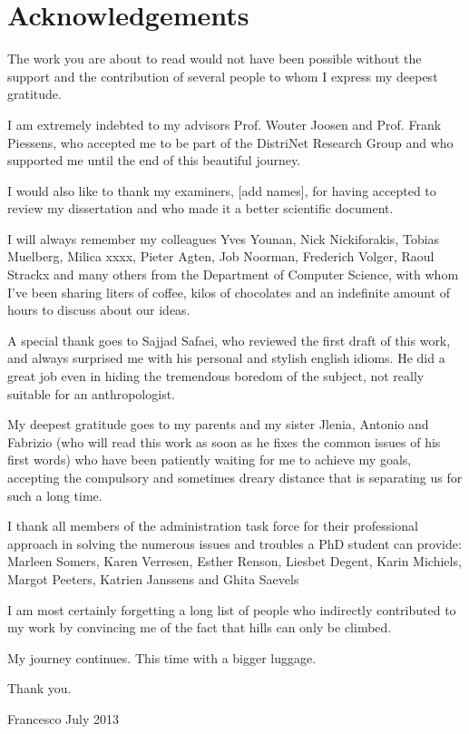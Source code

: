 \section*{Acknowledgements}

The work you are about to read would not have been possible without the support and the contribution of several people to whom I express my deepest gratitude.

I am extremely indebted to my advisors Prof. Wouter Joosen and Prof. Frank Piessens, who accepted me to be part of the DistriNet Research Group and who supported me until the end of this beautiful journey.

I would also like to thank my examiners, [add names], for having accepted to review my dissertation and who made it a better scientific document.

I will always remember my colleagues Yves Younan, Nick Nickiforakis, Tobias Muelberg, Milica xxxx, Pieter Agten, Job Noorman, Frederich Volger, Raoul Strackx and many others from the Department of Computer Science, with whom I’ve been sharing liters of coffee, kilos of chocolates and an indefinite amount of hours to discuss about our ideas.

A special thank goes to Sajjad Safaei, who reviewed the first draft of this work, and always surprised me with his personal and stylish english idioms. He did a great job even in hiding the tremendous boredom of the subject, not really suitable for an anthropologist.

My deepest gratitude goes to my parents and my sister Jlenia, Antonio and Fabrizio (who will  read this work as soon as he fixes the common issues of his first words) who have been patiently waiting for me to achieve my goals, accepting the compulsory and sometimes dreary distance that is separating us for such a long time.

I thank all members of the administration task force for their professional approach in solving the numerous issues and troubles a PhD student can provide: Marleen Somers, Karen Verresen, Esther Renson, Liesbet Degent, Karin Michiels, Margot Peeters, Katrien Janssens and Ghita Saevels

I am most certainly forgetting a long list of people who indirectly contributed to my work by convincing me of the fact that hills can only be climbed.  

My journey continues. This time with a bigger luggage.

Thank you.

Francesco
July 2013
